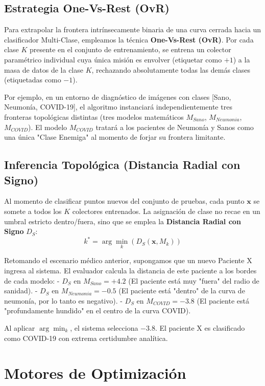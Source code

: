 \documentclass[10pt,twocolumn,letterpaper]{article}
\begin{document}
\subsection{Estrategia One-Vs-Rest (OvR)}
Para extrapolar la frontera intrínsecamente binaria de una curva cerrada hacia un clasificador Multi-Clase, empleamos la técnica \textbf{One-Vs-Rest (OvR)}. Por cada clase $K$ presente en el conjunto de entrenamiento, se entrena un colector paramétrico individual cuya única misión es envolver (etiquetar como $+1$) a la masa de datos de la clase $K$, rechazando absolutamente todas las demás clases (etiquetadas como $-1$).

Por ejemplo, en un entorno de diagnóstico de imágenes con clases [Sano, Neumonía, COVID-19], el algoritmo instanciará independientemente tres fronteras topológicas distintas (tres modelos matemáticos $M_{Sano}$, $M_{Neumonia}$, $M_{COVID}$). El modelo $M_{COVID}$ tratará a los pacientes de Neumonía y Sanos como una única "Clase Enemiga" al momento de forjar su frontera limitante.

\subsection{Inferencia Topológica (Distancia Radial con Signo)}
Al momento de clasificar puntos nuevos del conjunto de pruebas, cada punto $\mathbf{x}$ se somete a todos los $K$ colectores entrenados. La asignación de clase no recae en un umbral estricto dentro/fuera, sino que se emplea la \textbf{Distancia Radial con Signo} $D_S$:
\begin{equation}
    k^* = \arg\min_k \left( D_S(\mathbf{x}, M_k) \right)
\end{equation}

Retomando el escenario médico anterior, supongamos que un nuevo Paciente X ingresa al sistema. El evaluador calcula la distancia de este paciente a los bordes de cada modelo:
- $D_S$ en $M_{Sano} = +4.2$ (El paciente está muy "fuera" del radio de sanidad).
- $D_S$ en $M_{Neumonia} = -0.5$ (El paciente está "dentro" de la curva de neumonía, por lo tanto es negativo).
- $D_S$ en $M_{COVID} = -3.8$ (El paciente está "profundamente hundido" en el centro de la curva COVID).

Al aplicar $\arg\min_k$, el sistema selecciona $-3.8$. El paciente X es clasificado como COVID-19 con extrema certidumbre analítica.

\section{Motores de Optimización}
\end{document}
